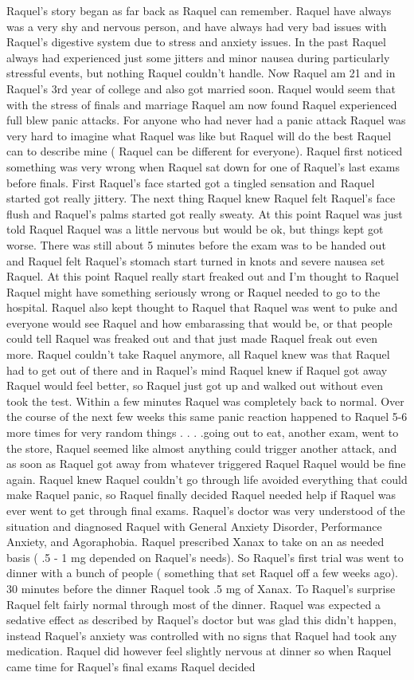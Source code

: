 \documentclass[12pt]{book}
\begin{document}
Raquel's story began as far back as Raquel can remember. Raquel have always was a very shy and nervous person, and have always had very bad issues with Raquel's digestive system due to stress and anxiety issues. In the past Raquel always had experienced just some jitters and minor nausea during particularly stressful events, but nothing Raquel couldn't handle. Now Raquel am 21 and in Raquel's 3rd year of college and also got married soon. Raquel would seem that with the stress of finals and marriage Raquel am now found Raquel experienced full blew panic attacks. For anyone who had never had a panic attack Raquel was very hard to imagine what Raquel was like but Raquel will do the best Raquel can to describe mine ( Raquel can be different for everyone). Raquel first noticed something was very wrong when Raquel sat down for one of Raquel's last exams before finals. First Raquel's face started got a tingled sensation and Raquel started got really jittery. The next thing Raquel knew Raquel felt Raquel's face flush and Raquel's palms started got really sweaty. At this point Raquel was just told Raquel Raquel was a little nervous but would be ok, but things kept got worse. There was still about 5 minutes before the exam was to be handed out and Raquel felt Raquel's stomach start turned in knots and severe nausea set Raquel. At this point Raquel really start freaked out and I'm thought to Raquel Raquel might have something seriously wrong or Raquel needed to go to the hospital. Raquel also kept thought to Raquel that Raquel was went to puke and everyone would see Raquel and how embarassing that would be, or that people could tell Raquel was freaked out and that just made Raquel freak out even more. Raquel couldn't take Raquel anymore, all Raquel knew was that Raquel had to get out of there and in Raquel's mind Raquel knew if Raquel got away Raquel would feel better, so Raquel just got up and walked out without even took the test. Within a few minutes Raquel was completely back to normal. Over the course of the next few weeks this same panic reaction happened to Raquel 5-6 more times for very random things . . .  .going out to eat, another exam, went to the store, Raquel seemed like almost anything could trigger another attack, and as soon as Raquel got away from whatever triggered Raquel Raquel would be fine again. Raquel knew Raquel couldn't go through life avoided everything that could make Raquel panic, so Raquel finally decided Raquel needed help if Raquel was ever went to get through final exams. Raquel's doctor was very understood of the situation and diagnosed Raquel with General Anxiety Disorder, Performance Anxiety, and Agoraphobia. Raquel prescribed Xanax to take on an as needed basis ( .5 - 1 mg depended on Raquel's needs). So Raquel's first trial was went to dinner with a bunch of people ( something that set Raquel off a few weeks ago). 30 minutes before the dinner Raquel took .5 mg of Xanax. To Raquel's surprise Raquel felt fairly normal through most of the dinner. Raquel was expected a sedative effect as described by Raquel's doctor but was glad this didn't happen, instead Raquel's anxiety was controlled with no signs that Raquel had took any medication. Raquel did however feel slightly nervous at dinner so when Raquel came time for Raquel's final exams Raquel decided 
\end{document}
